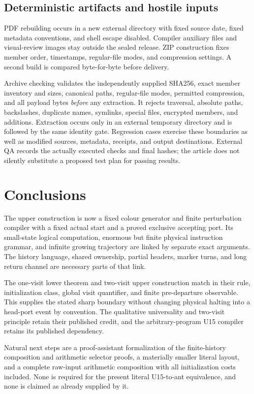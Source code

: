 \documentclass[11pt,letterpaper]{article}
\theoremstyle{definition}\newtheorem{definition}[theorem]{Definition}
\theoremstyle{remark}\newtheorem{remark}[theorem]{Remark}
\begin{document}
\subsection{Deterministic artifacts and hostile inputs}
PDF rebuilding occurs in a new external directory with fixed source date, fixed metadata conventions, and shell escape disabled. Compiler auxiliary files and visual-review images stay outside the sealed release. ZIP construction fixes member order, timestamps, regular-file modes, and compression settings. A second build is compared byte-for-byte before delivery.

Archive checking validates the independently supplied SHA256, exact member inventory and sizes, canonical paths, regular-file modes, permitted compression, and all payload bytes \emph{before} any extraction. It rejects traversal, absolute paths, backslashes, duplicate names, symlinks, special files, encrypted members, and additions. Extraction occurs only in an external temporary directory and is followed by the same identity gate. Regression cases exercise these boundaries as well as modified sources, metadata, receipts, and output destinations. External QA records the actually executed checks and final hashes; the article does not silently substitute a proposed test plan for passing results.

\section{Conclusions}\label{ptr:la:sec:conclusion}
The upper construction is now a fixed colour generator and finite perturbation compiler with a fixed actual start and a proved exclusive accepting port. Its small-state logical computation, enormous but finite physical instruction grammar, and infinite growing trajectory are linked by separate exact arguments. The history language, shared ownership, partial headers, marker turns, and long return channel are necessary parts of that link.

The one-visit lower theorem and two-visit upper construction match in their rule, initialization class, global visit quantifier, and finite pre-departure observable. This supplies the stated sharp boundary without changing physical halting into a head-port event by convention. The qualitative universality and two-visit principle retain their published credit, and the arbitrary-program U15 compiler retains its published dependency.

Natural next steps are a proof-assistant formalization of the finite-history composition and arithmetic selector proofs, a materially smaller literal layout, and a complete raw-input arithmetic composition with all initialization costs included. None is required for the present literal U15-to-ant equivalence, and none is claimed as already supplied by it.
\end{document}
